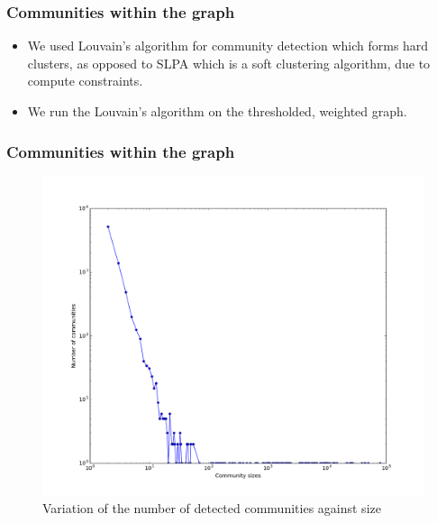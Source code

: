 \documentclass[9pt, compress]{beamer}
\begin{document}
\begin{frame}
	\frametitle{Communities within the graph}
\begin{itemize}
\item We used Louvain's algorithm for community detection which forms hard clusters, as opposed to SLPA which is a soft clustering algorithm, due to compute constraints.
\item We run the Louvain's algorithm on the thresholded, weighted graph.
\end{itemize}
\end{frame}

\begin{frame}
	\frametitle{Communities within the graph}
\begin{figure}
	\caption{Variation of the number of detected communities against size}
	\centering
    \includegraphics[width=0.75\linewidth]{img/community-counts.png}
\end{figure}
\end{frame}
\end{document}
